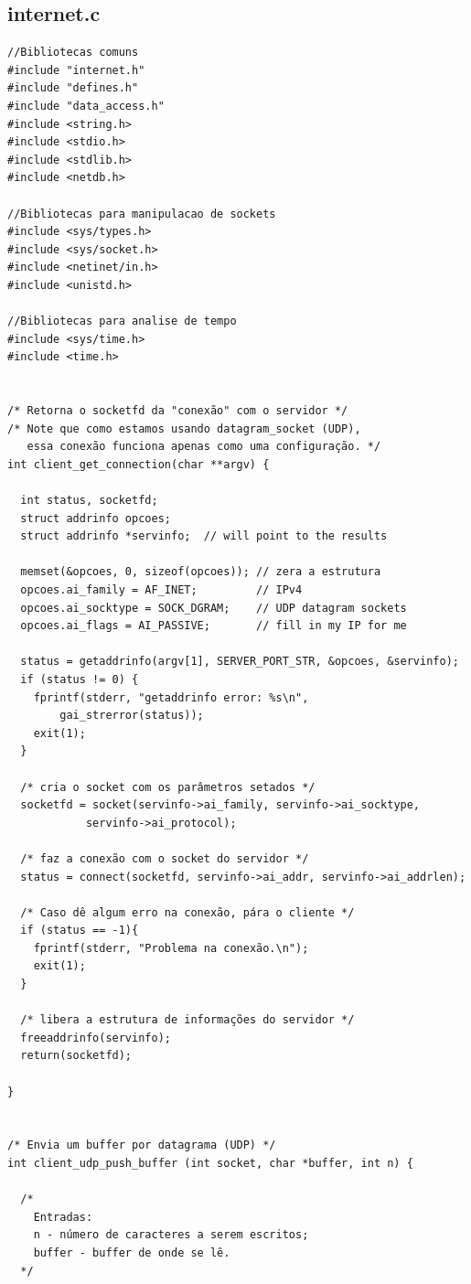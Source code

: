 \documentclass[11pt,twoside]{article}
\begin{document}
\subsection{internet.c}
\begin{verbatim}
//Bibliotecas comuns
#include "internet.h"
#include "defines.h"
#include "data_access.h"
#include <string.h>
#include <stdio.h>
#include <stdlib.h>
#include <netdb.h>

//Bibliotecas para manipulacao de sockets
#include <sys/types.h>
#include <sys/socket.h>
#include <netinet/in.h>
#include <unistd.h>

//Bibliotecas para analise de tempo
#include <sys/time.h>
#include <time.h>


/* Retorna o socketfd da "conexão" com o servidor */
/* Note que como estamos usando datagram_socket (UDP),
   essa conexão funciona apenas como uma configuração. */
int client_get_connection(char **argv) {

  int status, socketfd;
  struct addrinfo opcoes;
  struct addrinfo *servinfo;  // will point to the results

  memset(&opcoes, 0, sizeof(opcoes)); // zera a estrutura
  opcoes.ai_family = AF_INET;         // IPv4
  opcoes.ai_socktype = SOCK_DGRAM;    // UDP datagram sockets
  opcoes.ai_flags = AI_PASSIVE;       // fill in my IP for me

  status = getaddrinfo(argv[1], SERVER_PORT_STR, &opcoes, &servinfo);
  if (status != 0) {
    fprintf(stderr, "getaddrinfo error: %s\n", 
	    gai_strerror(status));
    exit(1);
  }
  
  /* cria o socket com os parâmetros setados */
  socketfd = socket(servinfo->ai_family, servinfo->ai_socktype, 
		    servinfo->ai_protocol);

  /* faz a conexão com o socket do servidor */
  status = connect(socketfd, servinfo->ai_addr, servinfo->ai_addrlen);
  
  /* Caso dê algum erro na conexão, pára o cliente */
  if (status == -1){
    fprintf(stderr, "Problema na conexão.\n");
    exit(1);
  }
  
  /* libera a estrutura de informações do servidor */
  freeaddrinfo(servinfo);
  return(socketfd);
  
}


/* Envia um buffer por datagrama (UDP) */
int client_udp_push_buffer (int socket, char *buffer, int n) {
  
  /*
    Entradas:
    n - número de caracteres a serem escritos;
    buffer - buffer de onde se lê.
  */
  

\end{verbatim}
\end{document}
